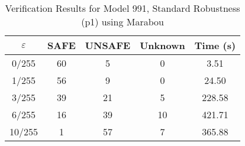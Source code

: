 \begin{table}[htbp]
\centering
\caption{Verification Results for Model 991, Standard Robustness (p1) using Marabou}
\label{tab:model991_p1_marabou}
\begin{tabular}{|c|c|c|c|c|}
\hline
$\varepsilon$ & SAFE & UNSAFE & Unknown & Time (s) \\ \hline
0/255 & 60 & 5 & 0 & 3.51 \\ \hline
1/255 & 56 & 9 & 0 & 24.50 \\ \hline
3/255 & 39 & 21 & 5 & 228.58 \\ \hline
6/255 & 16 & 39 & 10 & 421.71 \\ \hline
10/255 & 1 & 57 & 7 & 365.88 \\ \hline
\end{tabular}
\end{table}
